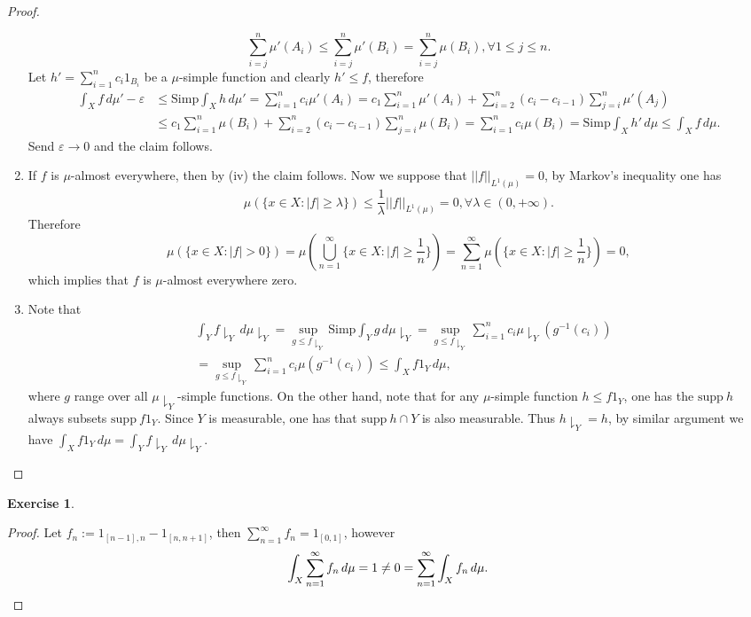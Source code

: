 \documentclass[a4paper]{article}
\newtheorem{ex}{Exercise}[subsection]
\begin{document}
\begin{proof}
\begin{enumerate}[label = (\roman*)]
$$    \sum_{i = j}^n \mu'(A_i) \leq \sum_{i = j}^n \mu'(B_i) = \sum_{i = j}^n \mu(B_i), \forall 1 \leq j \leq n.
    $$
    Let $h' = \sum_{i = 1}^n c_i1_{B_i}$ be a $\mu$-simple function and clearly $h' \leq f$, therefore \begin{align*}
    \int_X f\,d\mu' - \varepsilon &\leq \mathrm{Simp}\int_X h\,d\mu' = \sum_{i = 1}^n c_i\mu'(A_i)
    = c_1\sum_{i = 1}^n \mu'(A_i) + \sum_{i = 2}^n(c_i - c_{i - 1})\sum_{j = i}^n \mu'(A_j)\\
    &\leq c_1 \sum_{i = 1}^n \mu(B_i) + \sum_{i = 2}^n (c_i - c_{i - 1})\sum_{j = i}^n \mu(B_i) = 
    \sum_{i = 1}^n c_i\mu(B_i) = \mathrm{Simp}\int_X h'\,d\mu \leq \int_X f\,d\mu.
    \end{align*}
    Send $\varepsilon \to 0$ and the claim follows.
    \item If $f$ is $\mu$-almost everywhere, then by (iv) the claim follows. Now we suppose that $||f||_{L^1(\mu)} = 0$,
    by Markov's inequality one has $$
    \mu(\{x \in X : |f| \geq \lambda\}) \leq \frac{1}{\lambda}||f||_{L^1(\mu)} = 0, \forall \lambda \in (0, +\infty).
    $$Therefore $$
    \mu(\{x \in X : |f| > 0\}) = \mu(\bigcup_{n = 1}^\infty \{x \in X : |f| \geq \frac{1}{n}\}) = \sum_{n = 1}^\infty
    \mu(\{x \in X : |f| \geq \frac{1}{n}\}) = 0,
    $$which implies that $f$ is $\mu$-almost everywhere zero.
    \item Note that \begin{align*}
    &\int_Y f\downharpoonright_Y \,d\mu\downharpoonright_Y = \sup_{g \leq f\downharpoonright_Y}\mathrm{Simp}\int_Y 
    g\,d\mu\downharpoonright_Y = \sup_{g \leq f\downharpoonright_Y}\sum_{i = 1}^n c_i\mu\downharpoonright_Y(g^{-1}(c_i))\\ 
    &= \sup_{g \leq f\downharpoonright_Y}\sum_{i = 1}^n c_i\mu(g^{-1}(c_i)) \leq \int_X f1_Y\,d\mu,
    \end{align*}where $g$ range over all $\mu\downharpoonright_Y$-simple functions. On the other hand, note that for any 
    $\mu$-simple function $h \leq f1_Y$, one has the $\mathrm{supp}\ h$ always subsets $\mathrm{supp}\ f1_Y$. Since 
    $Y$ is measurable, one has that $\mathrm{supp}\ h \cap Y$ is also measurable. Thus $h\downharpoonright_Y = h$,
    by similar argument we have $\int_X f1_Y\,d\mu = \int_Y f \downharpoonright_Y \,d\mu\downharpoonright_Y$.
\end{enumerate}
\end{proof}

\begin{ex}\end{ex}\begin{proof}
Let $f_n := 1_{[n - 1], n} - 1_{[n, n + 1]}$, then $\sum_{n = 1}^\infty f_n = 1_{[0, 1]}$, however\[
\int_X \sum_{n = 1}^\infty f_n \,d\mu = 1 \ne 0 = \sum_{n = 1}^\infty \int_Xf_n\,d\mu.\qedhere
\]
\end{proof}
\end{document}
